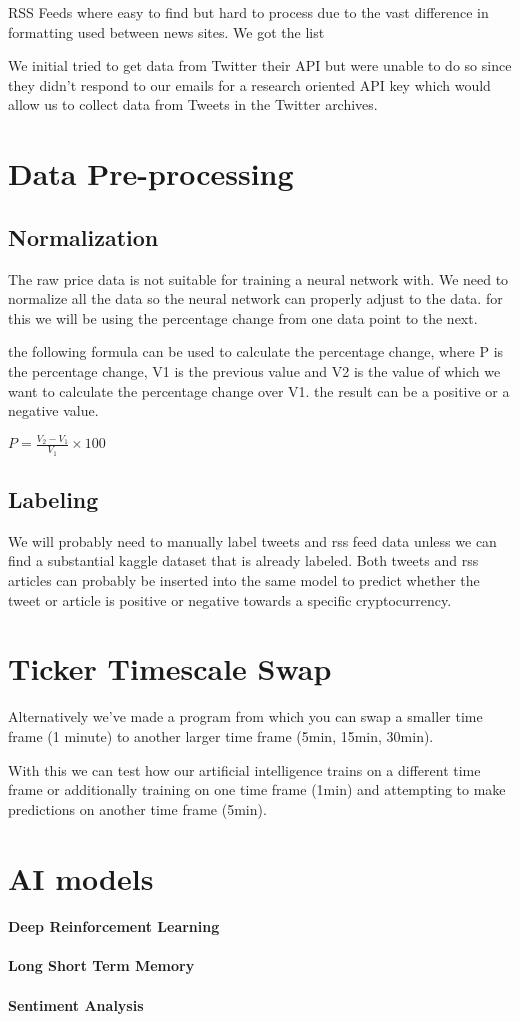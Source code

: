 \documentclass[12pt,a4paper]{article}
\begin{document}
RSS Feeds where easy to find but hard to process due to the vast difference in formatting used between news sites. We got the list

We initial tried to get data from Twitter their API but were unable to do so since they didn't respond to our emails for a research oriented API key which would allow us to collect data from Tweets in the Twitter archives.

\section{Data Pre-processing}

\subsection{Normalization}

The raw price data is not suitable for training a neural network with. We need to normalize all the data so the neural network can properly adjust to the data. for this we will be using the percentage change from one data point to the next.

the following formula can be used to calculate the percentage change, where P is the percentage change, V1 is the previous value and V2 is the value of which we want to calculate the percentage change over V1. the result can be a positive or a negative value.

{\large \( P = \frac{ V_2 - V_1 }{ V_1 } \times 100 \)}

\subsection{Labeling}

We will probably need to manually label tweets and rss feed data unless we can find a substantial kaggle dataset that is already labeled. Both tweets and rss articles can probably be inserted into the same model to predict whether the tweet or article is positive or negative towards a specific cryptocurrency.

\section{Ticker Timescale Swap}

Alternatively we've made a program from which you can swap a smaller time frame (1 minute) to another larger time frame (5min, 15min, 30min).

With this we can test how our artificial intelligence trains on a different time frame or additionally training on one time frame (1min) and attempting to make predictions on another time frame (5min).

\section{AI models}
\paragraph{Deep Reinforcement Learning}

\paragraph{Long Short Term Memory}

\paragraph{Sentiment Analysis}
\end{document}
